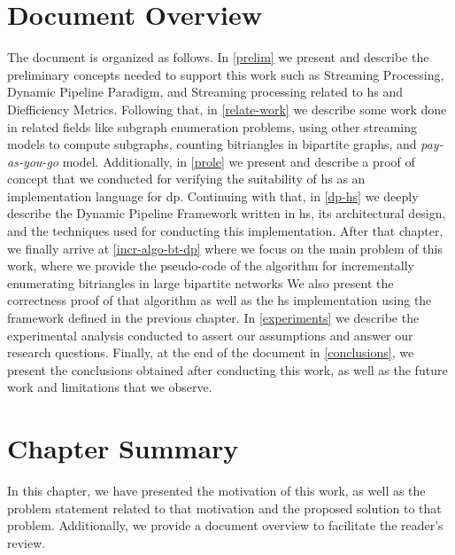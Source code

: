 \section{Document Overview} 
The document is organized as follows. In \autoref{prelim} we present and describe the preliminary concepts needed to support this work such as Streaming Processing, Dynamic Pipeline Paradigm, and Streaming processing related to \acrshort{hs} and Diefficiency Metrics. 
Following that, in \autoref{relate-work} we describe some work done in related fields like subgraph enumeration problems, using other streaming models to compute subgraphs, counting bitriangles in bipartite graphs, and \emph{pay-as-you-go} model.
Additionally, in \autoref{prole} we present and describe a proof of concept that we conducted for verifying the suitability of \acrshort{hs} as an implementation language for \acrshort{dp}. 
Continuing with that, in \autoref{dp-hs} we deeply describe the Dynamic Pipeline Framework written in \acrshort{hs}, its architectural design, and the techniques used for conducting this implementation.
After that chapter, we finally arrive at \autoref{incr-algo-bt-dp} where we focus on the main problem of this work, where we provide the pseudo-code of the algorithm for incrementally enumerating bitriangles in large bipartite networks
We also present the correctness proof of that algorithm as well as the \acrshort{hs} implementation using the framework defined in the previous chapter.
In \autoref{experiments} we describe the experimental analysis conducted to assert our assumptions and answer our research questions.
Finally, at the end of the document in \autoref{conclusions}, we present the conclusions obtained after conducting this work, as well as the future work and limitations that we observe.

\section{Chapter Summary}
In this chapter, we have presented the motivation of this work, as well as the problem statement related to that motivation and the proposed solution to that problem. Additionally, we provide a document overview to facilitate the reader's review.
